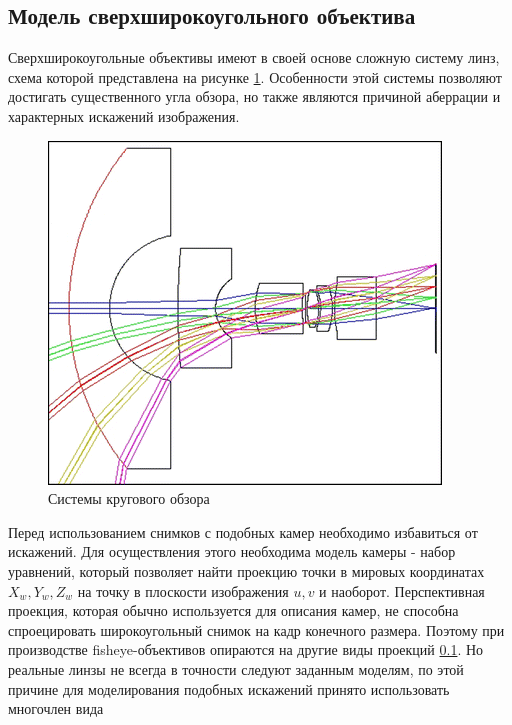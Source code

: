 \subsection{Модель сверхширокоугольного объектива}

Сверхширокоугольные объективы имеют в своей основе сложную систему линз, схема которой представлена на рисунке \ref{pic:fyscheme}. 
Особенности этой системы позволяют достигать существенного угла обзора, но также являются причиной аберрации и характерных искажений 
изображения. 

\begin{figure}[H]
    \begin{center}
        \includegraphics[scale=0.5]{pics/fisheye_scheme.png}                                                                                            %
        \caption{Системы кругового обзора}
        \label{pic:fyscheme}
    \end{center}
\end{figure}
    
Перед использованием снимков с подобных камер необходимо избавиться от искажений. Для осуществления этого необходима модель камеры - 
набор уравнений, который позволяет найти проекцию точки в мировых координатах ${X_w, Y_w, Z_w}$ на точку в плоскости изображения ${u, v}$ и наоборот. 
Перспективная проекция, которая обычно используется для описания камер, не способна спроецировать широкоугольный снимок на кадр конечного размера. Поэтому при производстве
 fisheye-объективов опираются на другие виды проекций \ref{}. Но реальные линзы не всегда в точности следуют заданным моделям, по этой 
 причине для моделирования подобных искажений принято использовать многочлен вида

